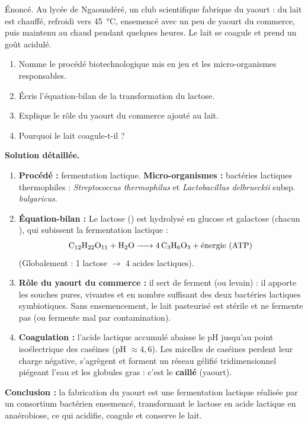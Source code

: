 \documentclass[11pt]{article}
\newcommand{\cle}[1]{{\popxbold\color{popdark}#1}}
\begin{document}
\begin{exoresolu}
Énoncé. Au lycée de Ngaoundéré, un club scientifique fabrique du yaourt : du lait est chauffé, refroidi vers \SI{45}{\celsius}, ensemencé avec un peu de yaourt du commerce, puis maintenu au chaud pendant quelques heures. Le lait se coagule et prend un goût acidulé.
\begin{enumerate}
\item Nomme le procédé biotechnologique mis en jeu et les micro-organismes responsables.
\item Écris l'équation-bilan de la transformation du lactose.
\item Explique le rôle du yaourt du commerce ajouté au lait.
\item Pourquoi le lait coagule-t-il ?
\end{enumerate}
\tcblower
\textbf{Solution détaillée.}
\begin{enumerate}
\item \textbf{Procédé :} \cle{fermentation lactique}. \textbf{Micro-organismes :} bactéries lactiques thermophiles : \emph{Streptococcus thermophilus} et \emph{Lactobacillus delbrueckii} subsp. \emph{bulgaricus}.
\item \textbf{Équation-bilan :} Le lactose () est hydrolysé en glucose et galactose (chacun ), qui subissent la fermentation lactique :
\[ \ce{C12H22O11 + H2O -> 4 C3H6O3} + \text{énergie (ATP)} \]
(Globalement : 1 lactose $\rightarrow$ 4 acides lactiques).
\item \textbf{Rôle du yaourt du commerce :} il sert de \cle{ferment} (ou levain) : il apporte les souches pures, vivantes et en nombre suffisant des deux bactéries lactiques symbiotiques. Sans ensemencement, le lait pasteurisé est stérile et ne fermente pas (ou fermente mal par contamination).
\item \textbf{Coagulation :} l'acide lactique accumulé abaisse le pH jusqu'au point isoélectrique des caséines (pH $\approx 4,6$). Les micelles de caséines perdent leur charge négative, s'agrègent et forment un réseau gélifié tridimensionnel piégeant l'eau et les globules gras : c'est le \textbf{caillé} (yaourt).
\end{enumerate}
\textbf{Conclusion :} la fabrication du yaourt est une fermentation lactique réalisée par un consortium bactérien ensemencé, transformant le lactose en acide lactique en anaérobiose, ce qui acidifie, coagule et conserve le lait.
\end{exoresolu}
\end{document}
